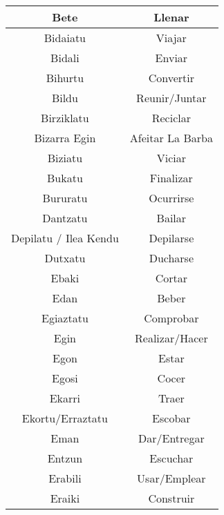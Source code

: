 \documentclass[11pt, a4paper]{article}
\begin{document}
\begin{longtable}{cc}
\hline
Bete                       & Llenar                      \\ 
\hline
Bidaiatu                   & Viajar                      \\ 
\hline
Bidali                     & Enviar                      \\ 
\hline
Bihurtu                    & Convertir                   \\ 
\hline
Bildu                      & Reunir/Juntar               \\ 
\hline
Birziklatu                 & Reciclar                    \\ 
\hline
Bizarra Egin               & Afeitar La Barba            \\ 
\hline
Biziatu                    & Viciar                      \\ 
\hline
Bukatu                     & Finalizar                   \\ 
\hline
Bururatu                   & Ocurrirse                   \\ 
\hline
Dantzatu                   & Bailar                      \\ 
\hline
Depilatu / Ilea Kendu      & Depilarse                   \\ 
\hline
Dutxatu                    & Ducharse                    \\ 
\hline
Ebaki                      & Cortar                      \\ 
\hline
Edan                       & Beber                       \\ 
\hline
Egiaztatu                  & Comprobar                   \\ 
\hline
Egin                       & Realizar/Hacer              \\ 
\hline
Egon                       & Estar                       \\ 
\hline
Egosi                      & Cocer                       \\ 
\hline
Ekarri                     & Traer                       \\ 
\hline
Ekortu/Erraztatu           & Escobar                     \\ 
\hline
Eman                       & Dar/Entregar                \\ 
\hline
Entzun                     & Escuchar                    \\ 
\hline
Erabili                    & Usar/Emplear                \\ 
\hline
Eraiki                     & Construir                   \\ 

\end{longtable}
\end{document}
